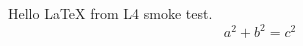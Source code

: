 \documentclass{article}
\begin{document}
Hello \LaTeX{} from L4 smoke test.
\begin{equation} a^2+b^2=c^2 \end{equation}
\end{document}
